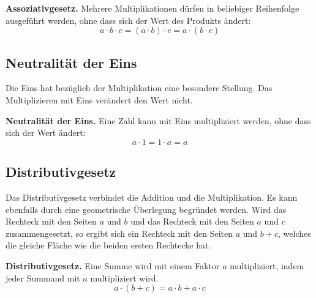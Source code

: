 \begin{theorem}
\textbf{Assoziativgesetz.} Mehrere Multiplikationen dürfen in beliebiger Reihenfolge ausgeführt werden, ohne dass sich der Wert des Produkts ändert:
\[
  a \cdot b \cdot c = (a \cdot b) \cdot c = a \cdot (b \cdot c)
\]
\end{theorem}

\subsection{Neutralität der Eins}

Die Eins hat bezüglich der Multiplikation eine besondere Stellung. Das Multiplizieren mit Eins verändert den Wert nicht.
\begin{theorem}
  \textbf{Neutralität der Eins.} Eine Zahl kann mit Eins multipliziert werden, ohne dass sich der Wert ändert:
  \[
    a \cdot 1 = 1 \cdot a = a
  \]
\end{theorem}


\subsection{Distributivgesetz}
Das Distributivgesetz verbindet die Addition und die Multiplikation. Es kann ebenfalls durch eine geometrische Überlegung begründet werden. Wird das Rechteck mit den Seiten $a$ und $b$ und das Rechteck mit den Seiten $a$ und $c$ zusammengesetzt, so ergibt sich ein Rechteck mit den Seiten $a$ und $b+c$, welches die gleiche Fläche wie die beiden ersten Rechtecke hat.
\begin{center}
\end{center}

\begin{theorem}
  \textbf{Distributivgesetz.} Eine Summe wird mit einem Faktor $a$ multipliziert, indem jeder Summand mit $a$ multipliziert wird.
  \[
    a \cdot (b + c) = a \cdot b + a \cdot c
  \]
\end{theorem}
